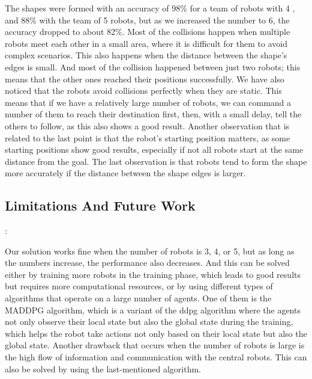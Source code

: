 \documentclass[12pt]{extarticle}
\begin{document}
The shapes were formed with an accuracy of 98\% for a team of robots with 4 , and 88\% with the team of  5 robots, but as we increased the number to 6, the accuracy dropped to about 82\%.
Most of the collisions happen when multiple robots meet each other in a small area, where it is difficult for them to avoid complex scenarios. This also happens when the distance between the shape's edges is small.
And most of the collision happened between just two robots; this means that the other ones reached their positions successfully. We have also noticed that the robots avoid collisions perfectly when they are static. This means that if we have a relatively large number of robots, we can command a number of them to reach their destination first, then, with a small delay, tell the others to follow, as this also shows a good result.
Another observation that is related to the last point is that the robot's starting position matters, as some starting positions show good results, especially if not all robots start at the same distance from the goal. \newpage The last observation is that robots tend to form the shape more accurately if the distance between the shape edges is larger.
 

\subsection{Limitations And Future Work}:

Our solution works fine when the number of robots is 3, 4, or 5, but as long as the numbers increase, the performance also decreases. And this can be solved either by training more robots in the training phase, which leads to good results but requires more computational resources, or by using different types of algorithms that operate on a large number of agents. One of them is the MADDPG algorithm, which is a variant of the ddpg algorithm where the agents not only observe their local state but also the global state during the training, which helps the robot take actions not only based on their local state but also the global state.
Another drawback that occurs when the number of robots is large is the high flow of information and communication with the central robots. This can also be solved by using the last-mentioned algorithm.
\end{document}
